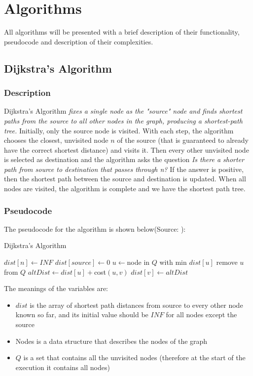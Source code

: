 \documentclass[runningheads]{llncs}
\begin{document}
\section{Algorithms}
All algorithms will be presented with a brief description of their functionality, pseudocode and description of their complexities.

\subsection{Dijkstra's Algorithm}
\subsubsection{Description}
Dijkstra's Algorithm \textit{fixes a single node as the "source" node and finds shortest paths from the source to all other nodes in the graph, producing a shortest-path tree.}\cite{ref_url_Dj} Initially, only the source node is visited. With each step, the algorithm chooses the closest, unvisited node $n$ of the source (that is guaranteed to already have the correct shortest distance) and visits it. Then every other unvisited node is selected as destination and the algorithm asks the question \emph{Is there a shorter path from source to destination that passes through n?} If the answer is positive, then the shortest path between the source and destination is updated. When all nodes are visited, the algorithm is complete and we have the shortest path tree.

\subsubsection{Pseudocode}
The pseudocode for the algorithm is shown below(Source: \cite{ref_url_Dj}):

\begin{algorithm}
\caption{Dijkstra's Algorithm}\label{algD:cap}
\begin{algorithmic}[1]
	\State $dist[n] \gets INF$
\EndFor
\State $dist[source] \gets 0$
	\State $u \gets $node in $Q$ with min $dist[u]$
	\State remove $u$ from $Q$
		\State $altDist \gets dist[u] + $cost$(u, v)$
			\State $dist[v] \gets altDist$
		\EndIf
	\EndFor
\EndWhile
\end{algorithmic}
\end{algorithm}

The meanings of the variables are:
\begin{itemize}
	\item $dist$ is the array of shortest path distances from source to every other node known so far, and its initial value should be $INF$ for all nodes except the source
	\item Nodes is a data structure that describes the nodes of the graph
	\item $Q$ is a set that contains all the unvisited nodes (therefore at the start of the execution it contains all nodes)
\end{itemize}
\end{document}
